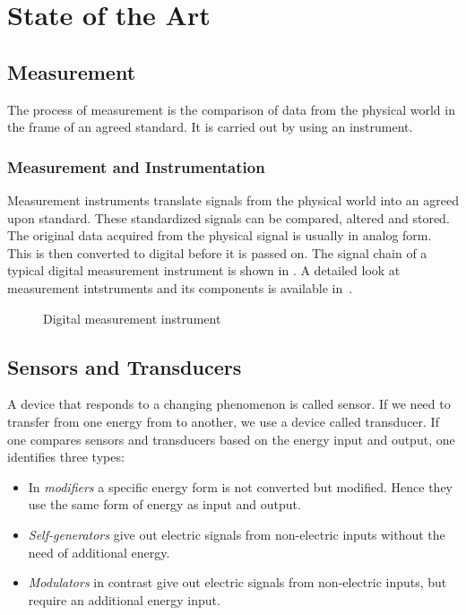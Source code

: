 \chapter{State of the Art%
  \label{chap:\currfilebase}}

\section{Measurement}
The process of measurement is the comparison of data from the physical world in the frame of an agreed standard. It is carried out by using an instrument.


\subsection{Measurement and Instrumentation}
Measurement instruments translate signals from the physical world into an agreed upon standard. These standardized signals can be compared, altered and stored.
The original data acquired from the physical signal is usually in analog form. This is then converted to digital before it is passed on. The signal chain of a typical digital measurement instrument is shown in . A detailed look at measurement intstruments and its components is available in~\cite{webster2018measurement}.

\begin{figure}[!htb]
  \centering
  
  \caption[Digital Instrument]{Digital measurement instrument%
    \label{fig:digital_instrument}}
\end{figure}

\section{Sensors and Transducers}
A device that responds to a changing phenomenon is called sensor. If we need to transfer from one energy from to another, we use a device called transducer. If one compares sensors and transducers based on the energy input and output, one identifies three types:
\begin{itemize}
  \item In \emph{modifiers} a specific energy form is not converted but modified. Hence they use the same form of energy as input and output.
  \item \emph{Self-generators} give out electric signals from non-electric inputs without the need of additional energy.
  \item \emph{Modulators} in contrast give out electric signals from non-electric inputs, but require an additional energy input.
\end{itemize}

